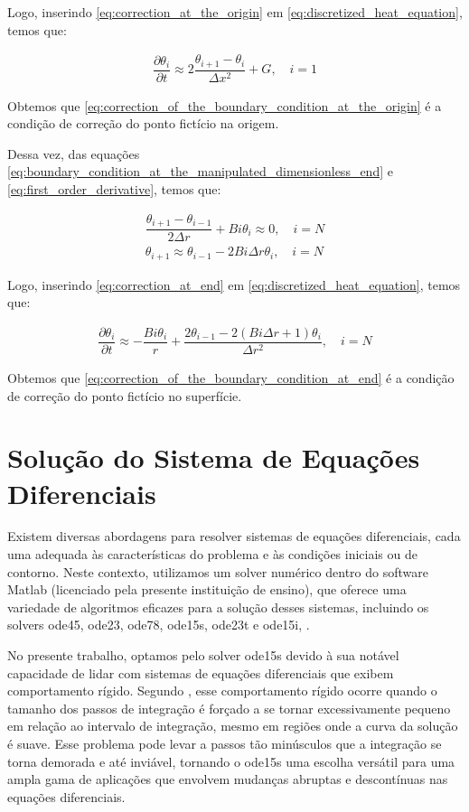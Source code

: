 Logo, inserindo \ref{eq:correction_at_the_origin} em \ref{eq:discretized_heat_equation}, temos que:

\begin{gather}
     \dfrac{\partial \theta _i}{\partial t} \approx 2 \dfrac{\theta _{i+1} - \theta _i}{\Delta x^2} + G, \quad i = 1
     \label{eq:correction_of_the_boundary_condition_at_the_origin}
\end{gather}

Obtemos que \ref{eq:correction_of_the_boundary_condition_at_the_origin} é a condição de correção do ponto fictício na origem.

Dessa vez, das equações \ref{eq:boundary_condition_at_the_manipulated_dimensionless_end} e \ref{eq:first_order_derivative}, temos que:

\begin{gather}
    \dfrac{\theta _{i+1} - \theta _{i-1}}{2 \Delta r} + Bi \theta _i \approx 0, \quad i = N \\
    \theta _{i+1} \approx \theta _{i-1} - 2 Bi \Delta r \theta _i, \quad i = N
    \label{eq:correction_at_end}
\end{gather}

Logo, inserindo \ref{eq:correction_at_end} em \ref{eq:discretized_heat_equation}, temos que:

\begin{gather}
     \dfrac{\partial \theta _i}{\partial t} \approx - \dfrac{Bi \theta _i}{r} + \dfrac{2 \theta _{i-1} - 2 (Bi \Delta r + 1) \theta _i}{\Delta r^2}, \quad i = N
     \label{eq:correction_of_the_boundary_condition_at_end}
\end{gather}

Obtemos que \ref{eq:correction_of_the_boundary_condition_at_end} é a condição de correção do ponto fictício no superfície.

\section{Solução do Sistema de Equações Diferenciais}

Existem diversas abordagens para resolver sistemas de equações diferenciais, cada uma adequada às características do problema e às condições iniciais ou de contorno. Neste contexto, utilizamos um solver numérico dentro do software Matlab (licenciado pela presente instituição de ensino), que oferece uma variedade de algoritmos eficazes para a solução desses sistemas, incluindo os solvers ode45, ode23, ode78, ode15s, ode23t e ode15i, \citep{matlab_ode15s}.

No presente trabalho, optamos pelo solver ode15s devido à sua notável capacidade de lidar com sistemas de equações diferenciais que exibem comportamento rígido. Segundo \citet{matlab_stiff}, esse comportamento rígido ocorre quando o tamanho dos passos de integração é forçado a se tornar excessivamente pequeno em relação ao intervalo de integração, mesmo em regiões onde a curva da solução é suave. Esse problema pode levar a passos tão minúsculos que a integração se torna demorada e até inviável, tornando o ode15s uma escolha versátil para uma ampla gama de aplicações que envolvem mudanças abruptas e descontínuas nas equações diferenciais.


